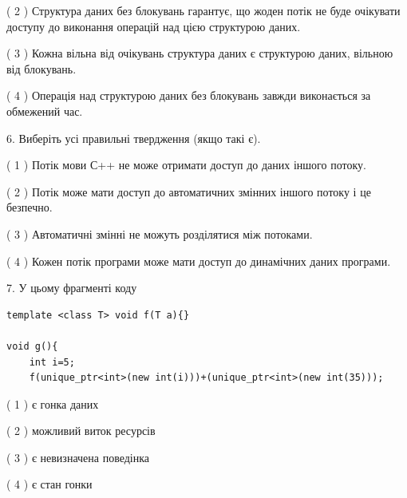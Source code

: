 \documentclass[12pt, ukrainian]{article}
\begin{document}
\begin {large}
{( 2 ) Структура даних без блокувань гарантує, що жоден потік не буде очікувати доступу до виконання операцій над цією структурою даних.%

( 3 ) Кожна вільна від очікувань структура даних є структурою даних, вільною від блокувань.%

( 4 ) Операція над структурою даних без блокувань завжди виконається за обмежений час.%
\newpage



\vspace{5mm}
6. Виберіть усі правильні твердження (якщо такі є).\par
\vspace{2mm}

( 1 ) Потік мови С++ не може отримати доступ до даних іншого потоку.%

( 2 ) Потік може мати доступ до автоматичних змінних іншого потоку і це безпечно.%

( 3 ) Автоматичні змінні не можуть розділятися між потоками.%

( 4 ) Кожен потік програми може мати доступ до динамічних даних програми.%


\vspace{5mm}
7. У цьому фрагменті коду
\begin{verbatim}
template <class T> void f(T a){}

void g(){
    int i=5;
    f(unique_ptr<int>(new int(i)))+(unique_ptr<int>(new int(35)));
\end{verbatim}
( 1 ) є гонка даних%

( 2 ) можливий виток ресурсів%

( 3 ) є невизначена поведінка%

( 4 ) є стан гонки%
}
\end {large}
\end{document}
